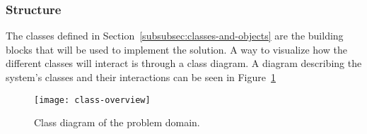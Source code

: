 \subsubsection{Structure}\label{subsubsec:structure}

The classes defined in Section~\ref{subsubsec:classes-and-objects} are the building blocks that will be used
to implement the solution.
A way to visualize how the different classes will interact is through a class diagram.
A diagram describing the system's classes and their interactions can be seen in Figure~\ref{fig:pda-class-diagram}

\begin{figure}[H]
    \centering
    \texttt{[image: class-overview]}
    \caption{Class diagram of the problem domain.
    }\label{fig:pda-class-diagram}
\end{figure}
